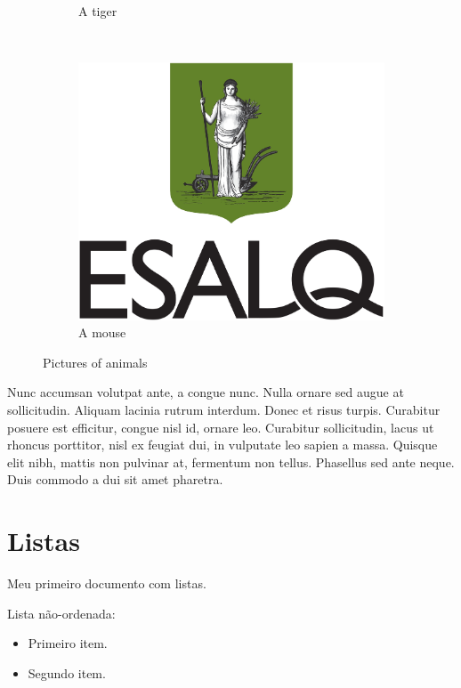 \documentclass{article}
\begin{document}
\begin{figure}
\begin{subfigure}[b]{0.3\textwidth}
			\caption{A tiger}
			\label{fig:tiger}
		\end{subfigure}
		~ %
		\begin{subfigure}[b]{0.3\textwidth}
			\includegraphics[width=\textwidth]{Figuras/brasao_esalq1.jpg}
			\caption{A mouse}
			\label{fig:mouse}
		\end{subfigure}
		\caption{Pictures of animals}\label{fig:animals}
	\end{figure}
	
	Nunc accumsan volutpat ante, a congue nunc. Nulla ornare sed augue at sollicitudin. Aliquam lacinia rutrum interdum. Donec et risus turpis. Curabitur posuere est efficitur, congue nisl id, ornare leo. Curabitur sollicitudin, lacus ut rhoncus porttitor, nisl ex feugiat dui, in vulputate leo sapien a massa. Quisque elit nibh, mattis non pulvinar at, fermentum non tellus. Phasellus sed ante neque. Duis commodo a dui sit amet pharetra.
	
	
	\section*{Listas}
	Meu primeiro documento com listas.
	
	Lista não-ordenada:
	
	\begin{itemize}
		\item Primeiro item.
		\item Segundo item.
	\end{itemize}
	
\end{document}

